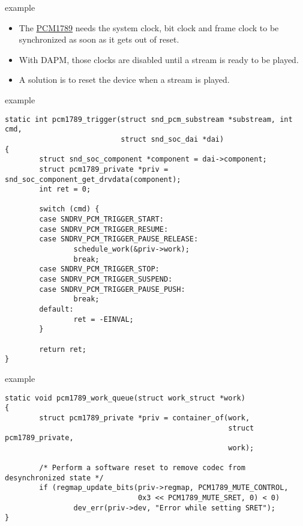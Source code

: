 \begin{frame}{ example}
  \begin{itemize}
  \item The \href{https://www.ti.com/lit/gpn/pcm1789}{PCM1789}
    needs the system clock, bit clock and frame clock
    to be synchronized as soon as it gets out of reset.
  \item With DAPM, those clocks are disabled until a stream is ready
    to be played.
  \item A solution is to reset the device when a stream is played.
  \end{itemize}
\end{frame}

\begin{frame}[fragile]{ example}
  \begin{block}{}
    \fontsize{8}{8}\selectfont
    \begin{verbatim}
static int pcm1789_trigger(struct snd_pcm_substream *substream, int cmd,
                           struct snd_soc_dai *dai)
{
        struct snd_soc_component *component = dai->component;
        struct pcm1789_private *priv = snd_soc_component_get_drvdata(component);
        int ret = 0;

        switch (cmd) {
        case SNDRV_PCM_TRIGGER_START:
        case SNDRV_PCM_TRIGGER_RESUME:
        case SNDRV_PCM_TRIGGER_PAUSE_RELEASE:
                schedule_work(&priv->work);
                break;
        case SNDRV_PCM_TRIGGER_STOP:
        case SNDRV_PCM_TRIGGER_SUSPEND:
        case SNDRV_PCM_TRIGGER_PAUSE_PUSH:
                break;
        default:
                ret = -EINVAL;
        }

        return ret;
}
    \end{verbatim}
  \end{block}
\end{frame}

\begin{frame}[fragile]{ example}
  \begin{block}{}
    \fontsize{8}{8}\selectfont
    \begin{verbatim}
static void pcm1789_work_queue(struct work_struct *work)
{
        struct pcm1789_private *priv = container_of(work,
                                                    struct pcm1789_private,
                                                    work);

        /* Perform a software reset to remove codec from desynchronized state */
        if (regmap_update_bits(priv->regmap, PCM1789_MUTE_CONTROL,
                               0x3 << PCM1789_MUTE_SRET, 0) < 0)
                dev_err(priv->dev, "Error while setting SRET");
}
    \end{verbatim}
  \end{block}
\end{frame}

